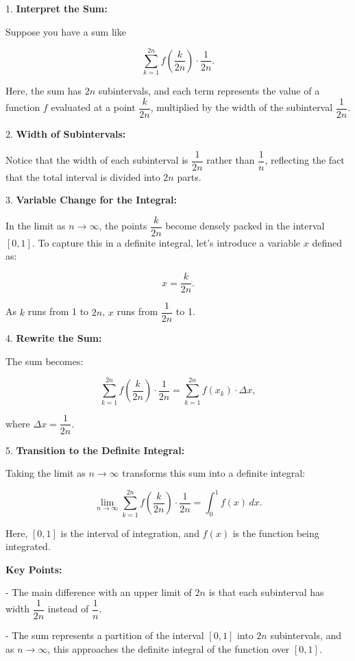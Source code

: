 \documentclass[a4paper,12pt]{book}
\begin{document}
1. \textbf{Interpret the Sum:}

   Suppose you have a sum like
   
   \[
   \sum_{k=1}^{2n} f\left(\dfrac{k}{2n}\right) \cdot \dfrac{1}{2n}.
   \]
   
   Here, the sum has \(2n\) subintervals, and each term represents the value of a function \(f\) evaluated at a point \(\dfrac{k}{2n}\), multiplied by the width of the subinterval \(\dfrac{1}{2n}\).

2. \textbf{Width of Subintervals:}

   Notice that the width of each subinterval is \(\dfrac{1}{2n}\) rather than \(\dfrac{1}{n}\), reflecting the fact that the total interval is divided into \(2n\) parts.

3. \textbf{Variable Change for the Integral:}

   In the limit as \(n \to \infty\), the points \(\dfrac{k}{2n}\) become densely packed in the interval \([0, 1]\). To capture this in a definite integral, let’s introduce a variable \(x\) defined as:
   
   \[
   x = \dfrac{k}{2n}.
   \]
   
   As \(k\) runs from 1 to \(2n\), \(x\) runs from \(\dfrac{1}{2n}\) to 1.

4. \textbf{Rewrite the Sum:}

   The sum becomes:
   
   \[
   \sum_{k=1}^{2n} f\left(\dfrac{k}{2n}\right) \cdot \dfrac{1}{2n} = \sum_{k=1}^{2n} f(x_k) \cdot \Delta x,
   \]
   
   where \(\Delta x = \dfrac{1}{2n}\).

5. \textbf{Transition to the Definite Integral:}

   Taking the limit as \(n \to \infty\) transforms this sum into a definite integral:
   
   \[
   \lim_{n \to \infty} \sum_{k=1}^{2n} f\left(\dfrac{k}{2n}\right) \cdot \dfrac{1}{2n} = \int_0^1 f(x) \, dx.
   \]
   
   Here, \([0, 1]\) is the interval of integration, and \(f(x)\) is the function being integrated.

\textbf{Key Points:}

- The main difference with an upper limit of \(2n\) is that each subinterval has width \(\dfrac{1}{2n}\) instead of \(\dfrac{1}{n}\).

- The sum represents a partition of the interval \([0, 1]\) into \(2n\) subintervals, and as \(n \to \infty\), this approaches the definite integral of the function over \([0, 1]\).
\end{document}
